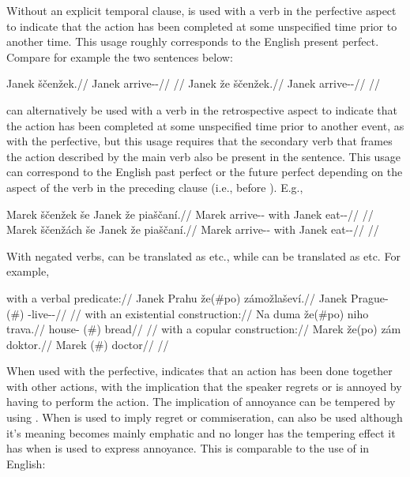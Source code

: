 Without an explicit temporal clause,  is used with a verb in the
perfective aspect to indicate that the action has been completed at some
unspecified time prior to another time. This usage roughly corresponds to the
English present perfect. Compare for example the two sentences below:

\pex
\a
\begingl
	\gla Janek ščenžek.//
	\glb Janek arrive-\Av{}-\Pf{}//
	\glft {}//
\endgl
\a
\begingl
	\gla Janek že ščenžek.//
	\glb Janek \Pfv{} arrive-\Av{}-\Pf{}//
	\glft {}//
\endgl
\xe

 can alternatively be used with a verb in the retrospective aspect to
indicate that the action has been completed at some unspecified time prior to
another event, as with the perfective, but this usage requires that the
secondary verb that frames the action described by the main verb also be present
in the sentence. This usage can correspond to the English past perfect or the
future perfect depending on the aspect of the verb in the preceding clause
(i.e., before ). E.g.,

\pex
\a
\begingl
	\gla Marek ščenžek še Janek že piaščaní.//
	\glb Marek arrive-\Av{}-\Pf{} with Janek \Pfv{} eat-\Av{}-\Ret{}//
	\glft {}//
\endgl
\a
\begingl
	\gla Marek ščenžách še Janek že piaščaní.//
	\glb Marek arrive-\Av{}-\Ctp{} with Janek \Pfv{} eat-\Av{}-\Ret{}//
	\glft {}//
\endgl
\xe

With negated verbs,  can be translated as    etc., while  can be translated as   etc. For example,

\pex
\a
\begingl
	\glpreamble with a verbal predicate://
	\gla Janek Prahu že(\#po) zámožlaševí.//
	\glb Janek Prague-\Ins{} \Pfv{}(\#\Ipfv{}) \Neg{}-live-\Av{}-\Cont{}//
	\glft {}//
\endgl
\a
\begingl
	\glpreamble with an existential construction://
	\gla Na duma že(\#po) niho trava.//
	\glb \Loc{} house-\Acc{} \Pfv{}(\#\Ipfv{}) \N{}\Exst{} bread//
	\glft {}//
\endgl
\a
\begingl
	\glpreamble with a copular construction://
	\gla Marek že(po) zám doktor.//
	\glb Marek \Pfv{}(\#\Ipfv{}) \N{}\Cop{} doctor//
	\glft {}//
\endgl
\xe

When used with the perfective,  indicates that an action has been done
together with other actions, with the implication that the speaker regrets or is
annoyed by having to perform the action. The implication of annoyance can be
tempered by using . When  is used to imply regret or
commiseration,  can also be used although it's meaning becomes mainly
emphatic and no longer has the tempering effect it has when  is used to
express annoyance. This is comparable to the use of  in English:

